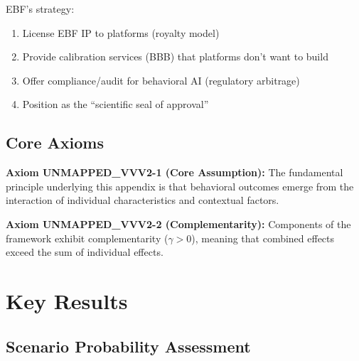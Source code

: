 EBF's strategy:
\begin{enumerate}
\item License EBF IP to platforms (royalty model)
\item Provide calibration services (BBB) that platforms don't want to build
\item Offer compliance/audit for behavioral AI (regulatory arbitrage)
\item Position as the ``scientific seal of approval''
\end{enumerate}



\subsection{Core Axioms}
\label{sec:vvv2-axioms}

\begin{tcolorbox}[colback=yellow!5!white,colframe=yellow!75!black,title=Axiom UNMAPPED_VVV2-1: Fundamental Principle]
\textbf{Axiom UNMAPPED_VVV2-1 (Core Assumption):}
The fundamental principle underlying this appendix is that behavioral outcomes
emerge from the interaction of individual characteristics and contextual factors.
\end{tcolorbox}

\begin{tcolorbox}[colback=yellow!5!white,colframe=yellow!75!black,title=Axiom UNMAPPED_VVV2-2: Complementarity]
\textbf{Axiom UNMAPPED_VVV2-2 (Complementarity):}
Components of the framework exhibit complementarity ($\gamma > 0$), meaning
that combined effects exceed the sum of individual effects.
\end{tcolorbox}


\section{Key Results}
\label{sec:vvv1-results}

\subsection{Scenario Probability Assessment}

